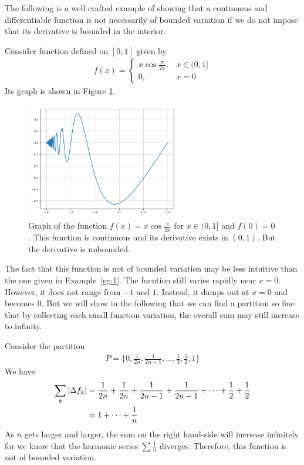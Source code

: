 \documentclass[thmcnt=section, color=blue, 12pt]{my-elegantbook}
\begin{document}
The following is a well crafted example of showing that
a continuous and differentiable function is not necessarily
of bounded variation
if we do not impose that its derivative is bounded in the interior.

\begin{example}
	Consider function defined on $[0, 1]$ given by
	\begin{align*}
		f(x) = \begin{cases}
			       x \cos \frac{\pi}{2x}, & x \in (0, 1] \\
			       0,                     & x = 0
		       \end{cases}
	\end{align*}
	Its graph is shown in Figure \ref{fig:2}.

	\begin{figure}[H]
		\centering
		\includegraphics[width=0.6\textwidth]{figures/continuous-function-that-is-not-of-bounded-variation.png}
		\caption{Graph of the function $f(x) = x \cos \frac{\pi}{2x}$ for $x \in (0, 1]$ and $f(0) = 0$. This function is continuous and its derivative exists in $(0, 1)$. But the derivative is unbounded.}
		\label{fig:2}
	\end{figure}

	The fact that this function is not of bounded variation may be less intuitive
	than the one given in Example~\ref{eg:1}.
	The fucntion still varies rapidly near $x=0$.
	However, it does not range from $-1$ and $1$.
	Instead, it damps out at $x=0$ and becomes $0$.
	But we will show in the following that we can find a partition so fine that
	by collecting each small function variation,
	the overall sum may still increase to infinity.

	Consider the partition
	\begin{align*}
		P = \{0, \frac{1}{2n}, \frac{1}{2n - 1}, \dots, \frac{1}{3}, \frac{1}{2}, 1\}
	\end{align*}
	We have
	\begin{align*}
		\sum_k \left\lvert \Delta f_k \right\rvert
		 & = \frac{1}{2n} + \frac{1}{2n} + \frac{1}{2n - 1} + \frac{1}{2n - 1}
		+ \dots + \frac{1}{2} + \frac{1}{2}                                    \\
		 & = 1 + \cdots + \frac{1}{n}
	\end{align*}
	As $n$ gets larger and larger,
	the sum on the right hand-side will increase infinitely
	for we know that the harmonic series $\sum \frac{1}{n}$ diverges.
	Therefore, this function is not of bounded variation.
\end{example}
\end{document}
